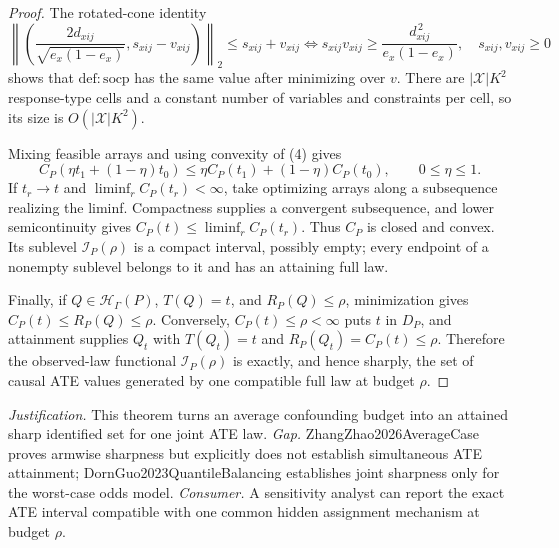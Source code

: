 \documentclass{article}
\begin{document}
\begin{proof}
The rotated-cone identity
\[
\left\|\left(\frac{2d_{xij}}{\sqrt{e_x(1-e_x)}},s_{xij}-v_{xij}\right)\right\|_2
\leq s_{xij}+v_{xij}
\Longleftrightarrow
s_{xij}v_{xij}\geq\frac{d_{xij}^{\,2}}{e_x(1-e_x)},\quad s_{xij},v_{xij}\geq0 \tag{6}
\]
shows that \(\mathrm{def{:}socp}\) has the same value after minimizing over \(v\). There are \(|\mathcal X|K^2\) response-type cells and a constant number of variables and constraints per cell, so its size is \(O(|\mathcal X|K^2)\).

Mixing feasible arrays and using convexity of (4) gives
\[
C_P(\eta t_1+(1-\eta)t_0)\leq\eta C_P(t_1)+(1-\eta)C_P(t_0),\qquad 0\leq\eta\leq1. \tag{7}
\]
If \(t_r\to t\) and \(\liminf_rC_P(t_r)<\infty\), take optimizing arrays along a subsequence realizing the liminf. Compactness supplies a convergent subsequence, and lower semicontinuity gives \(C_P(t)\leq\liminf_rC_P(t_r)\). Thus \(C_P\) is closed and convex. Its sublevel \(\mathcal I_P(\rho)\) is a compact interval, possibly empty; every endpoint of a nonempty sublevel belongs to it and has an attaining full law.

Finally, if \(Q\in\mathcal H_\Gamma(P)\), \(T(Q)=t\), and \(R_P(Q)\leq\rho\), minimization gives \(C_P(t)\leq R_P(Q)\leq\rho\). Conversely, \(C_P(t)\leq\rho<\infty\) puts \(t\) in \(D_P\), and attainment supplies \(Q_t\) with \(T(Q_t)=t\) and \(R_P(Q_t)=C_P(t)\leq\rho\). Therefore the observed-law functional \(\mathcal I_P(\rho)\) is exactly, and hence sharply, the set of causal ATE values generated by one compatible full law at budget \(\rho\).
\end{proof}
\par\smallskip\noindent \textit{Justification.} This theorem turns an average confounding budget into an attained sharp identified set for one joint ATE law. \textit{Gap.} ZhangZhao2026AverageCase proves armwise sharpness but explicitly does not establish simultaneous ATE attainment; DornGuo2023QuantileBalancing establishes joint sharpness only for the worst-case odds model. \textit{Consumer.} A sensitivity analyst can report the exact ATE interval compatible with one common hidden assignment mechanism at budget \(\rho\).
\end{document}
